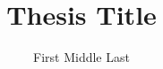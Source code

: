   \title{Thesis Title}              %
  \author{First Middle Last}        %
  \degree{\MSc}                     %
  \specialization{}                 %
  \faculty{}                        %
  \convocationdate{\the\year}            %


  

  

  

  









  \maketitle                   %
  \makeabstract                %
  \makepreface                 %
  \makededicationandquote     %
  \acknowledgements            %

